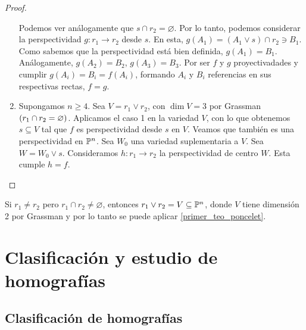 \begin{proof}
\begin{enumerate}
         Podemos ver análogamente que $s \cap r_2 = \varnothing$. Por 
         lo tanto, podemos considerar la perspectividad $g: r_1 \to
         r_2$ desde $s$. En esta, $g(A_1) = (A_1 \vee s) \cap r_2 \ni
         B_1$. Como sabemos que la perspectividad está bien definida,
         $g(A_1) = B_1$. Análogamente, $g(A_2) = B_2$, $g(A_3) = B_3$.
         Por ser $f$ y $g$ proyectivadades y cumplir $g(A_i) = B_i =
         f(A_i)$, formando $A_i$ y $B_i$ referencias en sus 
         respectivas rectas, $f = g$.
        \item Supongamos $n \geq 4$. Sea $V = r_1 \vee r_2$, con
        $\dim V = 3$ por Grassman $\left( r_1 \cap r_2 = \varnothing\right)$.
        Aplicamos el caso 1 en la variedad $V$, con lo que obtenemos
        $s \subseteq V$ tal que $f$ es perspectividad desde $s$ en
        $V$. Veamos que también es una perspectividad en $\mathbb{P}^n$.
        Sea $W_0$ una variedad suplementaria a $V$. Sea $W = W_0 \vee
        s$. Consideramos $h: r_1 \to r_2$ la perspectividad de centro
        $W$. Esta cumple $h = f$.
    \end{enumerate}
\end{proof}

\begin{obs}
    Si $r_1 \neq r_2$ pero $r_1 \cap r_2 \neq \varnothing$, entonces
    $r_1 \vee r_2 = V \subseteq \mathbb{P}^n$, donde $V$ tiene dimensión
    2 por Grassman y por lo tanto se puede 
    aplicar \ref{primer_teo_poncelet}.
\end{obs}

\section{Clasificación y estudio de homografías}

\subsection{Clasificación de homografías}

